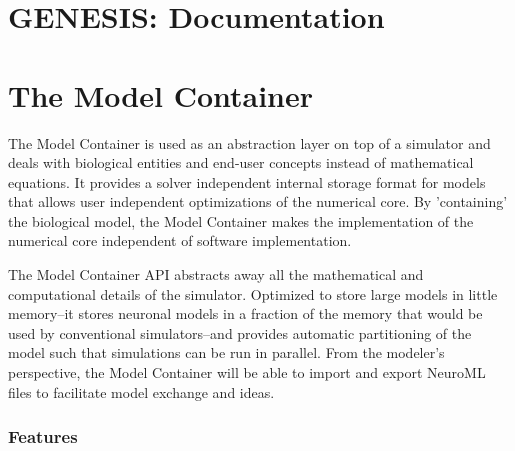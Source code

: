 \documentclass[12pt]{article}
\begin{document}
\section*{GENESIS: Documentation}

\section*{The Model Container}

The Model Container is used as an abstraction layer on top of a simulator and deals with biological entities and end-user concepts instead of mathematical equations. It provides a solver independent internal storage format for models that allows user independent optimizations of the numerical core. By 'containing' the biological model, the Model Container makes the implementation of the numerical core independent of software implementation.

The Model Container API abstracts away all the mathematical and computational details of the simulator. Optimized to store large models in little memory--it stores neuronal models in a fraction of the memory that would be used by conventional simulators--and provides automatic partitioning of the model such that simulations can be run in parallel. From the modeler's perspective, the Model Container will be able to import and export NeuroML files to facilitate model exchange and ideas.

\subsubsection*{Features}
\end{document}
